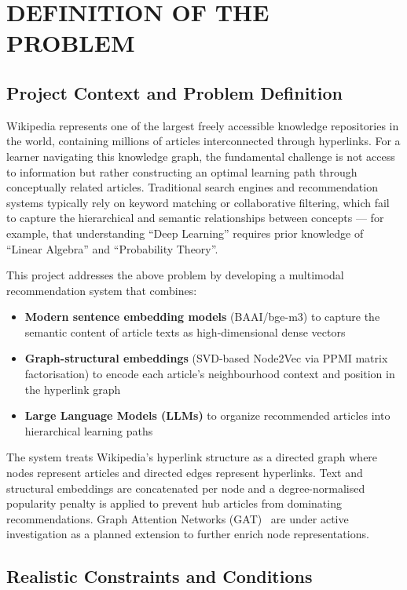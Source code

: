 \chapter{DEFINITION OF THE PROBLEM}
\thispagestyle{empty}

\section{Project Context and Problem Definition}

Wikipedia represents one of the largest freely accessible knowledge repositories in the world, containing millions of articles interconnected through hyperlinks. For a learner navigating this knowledge graph, the fundamental challenge is not access to information but rather constructing an optimal learning path through conceptually related articles. Traditional search engines and recommendation systems typically rely on keyword matching or collaborative filtering, which fail to capture the hierarchical and semantic relationships between concepts --- for example, that understanding ``Deep Learning'' requires prior knowledge of ``Linear Algebra'' and ``Probability Theory''.

This project addresses the above problem by developing a multimodal recommendation system that combines:
\begin{itemize}
    \item \textbf{Modern sentence embedding models} (BAAI/bge-m3) to capture the semantic content of article texts as high-dimensional dense vectors
    \item \textbf{Graph-structural embeddings} (SVD-based Node2Vec via PPMI matrix factorisation) to encode each article's neighbourhood context and position in the hyperlink graph
    \item \textbf{Large Language Models (LLMs)} to organize recommended articles into hierarchical learning paths
\end{itemize}

The system treats Wikipedia's hyperlink structure as a directed graph where nodes represent articles and directed edges represent hyperlinks. Text and structural embeddings are concatenated per node and a degree-normalised popularity penalty is applied to prevent hub articles from dominating recommendations. Graph Attention Networks (GAT)~\cite{velickovic2018graph} are under active investigation as a planned extension to further enrich node representations.

\section{Realistic Constraints and Conditions}

